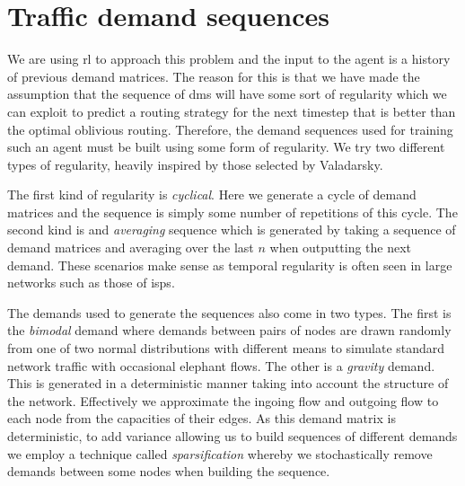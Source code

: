 \section{Traffic demand sequences}
\label{section:demands}
We are using \ac{rl} to approach this problem and the input to the agent is a history of previous demand matrices. The reason for this is that we have made the assumption that the sequence of \acp{dm} will have some sort of regularity which we can exploit to predict a routing strategy for the next timestep that is better than the optimal oblivious routing. Therefore, the demand sequences used for training such an agent must be built using some form of regularity. We try two different types of regularity, heavily inspired by those selected by Valadarsky\cite{valadarsky2017learning}.

The first kind of regularity is \emph{cyclical}. Here we generate a cycle of demand matrices and the sequence is simply some number of repetitions of this cycle. The second kind is and \emph{averaging} sequence which is generated by taking a sequence of demand matrices and averaging over the last $n$ when outputting the next demand. These scenarios make sense as temporal regularity is often seen in large networks such as those of \acp{isp}\cite{fortz2002optimizing}.

The demands used to generate the sequences also come in two types. The first is the \emph{bimodal}\cite{medina2002traffic} demand where demands between pairs of nodes are drawn randomly from one of two normal distributions with different means to simulate standard network traffic with occasional elephant flows. The other is a \emph{gravity} demand\cite{roughan2002experience}. This is generated in a deterministic manner taking into account the structure of the network. Effectively we approximate the ingoing flow and outgoing flow to each node from the capacities of their edges. As this demand matrix is deterministic, to add variance allowing us to build sequences of different demands we employ a technique called \emph{sparsification} whereby we stochastically remove demands between some nodes when building the sequence.

